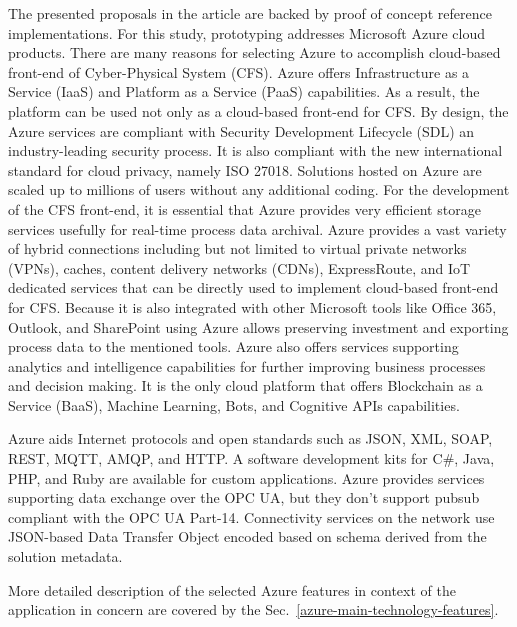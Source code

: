 \documentclass{jacsart}
\begin{document}
The presented proposals in the article are backed by proof of concept reference implementations. For this study, prototyping addresses Microsoft Azure cloud products. There are many reasons for selecting Azure to accomplish cloud-based front-end of Cyber-Physical System (CFS). Azure offers Infrastructure as a Service (IaaS) and Platform as a Service (PaaS) capabilities. As a result, the platform can be used not only as a cloud-based front-end for CFS. By design, the Azure services are compliant with Security Development Lifecycle (SDL) an industry-leading security process. It is also compliant with the new international standard for cloud privacy, namely ISO 27018. Solutions hosted on Azure are scaled up to millions of users without any additional coding. For the development of the CFS front-end, it is essential that Azure provides very efficient storage services usefully for real-time process data archival. Azure provides a vast variety of hybrid connections including but not limited to virtual private networks (VPNs), caches, content delivery networks (CDNs), ExpressRoute, and IoT dedicated services that can be directly used to implement cloud-based front-end for CFS. Because it is also integrated with other Microsoft tools like Office 365, Outlook, and SharePoint using Azure allows preserving investment and exporting process data to the mentioned tools. Azure also offers services supporting analytics and intelligence capabilities for further improving business processes and decision making. It is the only cloud platform that offers Blockchain as a Service (BaaS), Machine Learning, Bots, and Cognitive APIs capabilities.

Azure aids Internet protocols and open standards such as JSON, XML, SOAP, REST, MQTT, AMQP, and HTTP. A software development kits for C\#, Java, PHP, and Ruby are available for custom applications. Azure provides services supporting data exchange over the OPC UA, but they don't support pubsub compliant with the OPC UA Part-14. Connectivity services on the network use JSON-based Data Transfer Object encoded based on schema derived from the solution metadata.

More detailed description of the selected Azure features in context of the application in concern are covered by the Sec.~\ref*{azure-main-technology-features}.
\end{document}
